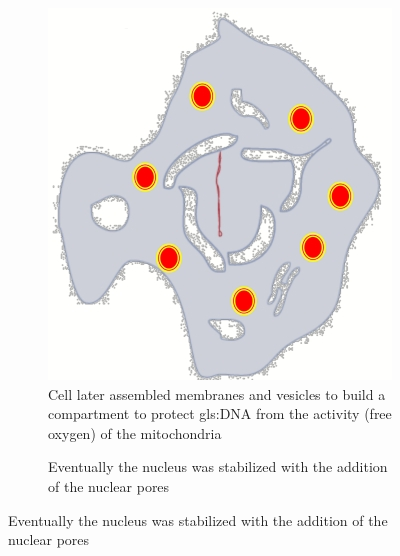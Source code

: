 \documentclass[]{article}
\begin{document}
\begin{figure}[H]
\begin{subfigure}[b]{0.45\textwidth}
	\end{subfigure}
	\begin{subfigure}[b]{0.45\textwidth}
		\caption{Cell later assembled membranes and vesicles to build a compartment to protect \gls{gls:DNA} from the activity (free oxygen) of the mitochondria}\label{fig:outside:in3}
		\includegraphics[width=\textwidth]{OutsideIn3}
	\end{subfigure}
	\begin{subfigure}[b]{0.45\textwidth}
		\caption{Eventually the nucleus was stabilized with the addition of the nuclear pores}\label{fig:outside:in4}

\end{subfigure}
\end{figure}
\end{document}
